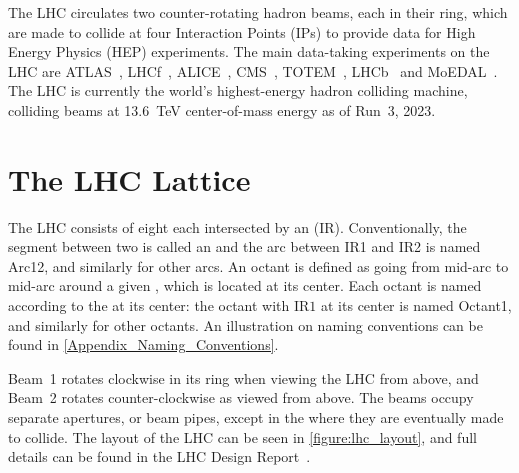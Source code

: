 The LHC circulates two counter-rotating hadron beams, each in their ring, which are made to collide at four Interaction Points (IPs) to provide data for High Energy Physics (HEP) experiments.
The main data-taking experiments on the LHC are ATLAS~\cite{Website:ATLAS,Website:ATLAS_CDS}, LHCf~\cite{Website:LHCf,Website:LHCf_CDS}, ALICE~\cite{Website:ALICE,Website:ALICE_CDS}, CMS~\cite{Website:CMS,Website:CMS_CDS}, TOTEM~\cite{Website:TOTEM,Website:TOTEM_CDS}, LHCb~\cite{Website:LHCb,Website:LHCb_CDS} and MoEDAL~\cite{Website:MOEDAL,Website:MOEDAL_CDS}.
The LHC is currently the world's highest-energy hadron colliding machine, colliding beams at \qty{13.6}{\tera\electronvolt} center-of-mass energy as of Run~\num{3}, \num{2023}.


\section{The LHC Lattice}
\label{section:lhc_lattice}

The LHC consists of eight  each intersected by an  (IR).
Conventionally, the segment between two \IRs is called an  and the arc between IR1 and IR2 is named Arc12, and similarly for other arcs.
An octant is defined as going from mid-arc to mid-arc around a given \IR, which is located at its center.
Each octant is named according to the \IR at its center: the octant with \(\mathrm{IR1}\) at its center is named Octant1, and similarly for other octants.
An illustration on naming conventions can be found in \cref{Appendix_Naming_Conventions}.

Beam~1 rotates clockwise in its ring when viewing the LHC from above, and Beam~2 rotates counter-clockwise as viewed from above.
The beams occupy separate apertures, or beam pipes, except in the \IRs where they are eventually made to collide.
The layout of the LHC can be seen in \cref{figure:lhc_layout}, and full details can be found in the LHC Design Report~\cite{BOOK:Bruning:LHC_Design_Report_Main_Ring,BOOK:Bruning:LHC_Design_Report_Infrastructure,BOOK:Benedikt:LHC_Design_Report_Injector_Chain}.

